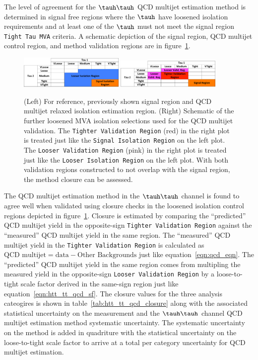 The level of agreement for the $\tauh\tauh$ QCD multijet estimation method
is determined in signal free regions where the $\tauh$ have loosened isolation requirements and at least
one of the $\tauh$ must not meet the signal region \texttt{Tight Tau MVA} criteria. A schematic depiction
of the signal region, QCD multijet control region, and method validation regions are in 
figure~\ref{fig:htt_tautau_qcd_schematic2}.

\begin{figure}[htbp]
\centering
     \includegraphics[width=0.45\textwidth]{higgs_to_taus/plots/tautau_QCD_signal_region.pdf}
     \includegraphics[width=0.45\textwidth]{higgs_to_taus/plots/tautau_QCD_closureTestRegions.pdf}\\
     \caption{
(Left) For reference, previously shown signal region and QCD multijet relaxed isolation estimation region.
(Right) Schematic of the further loosened MVA isolation selections used for the QCD multijet validation.
The \texttt{Tighter Validation Region} (red) in the right plot is treated just like the \texttt{Signal Isolation Region}
on the left plot. The \texttt{Looser Validation Region} (pink) in the right plot is treated just like the 
\texttt{Looser Isolation Region} on the left plot. With both validation regions constructed to not overlap with the
signal region, the method closure can be assessed.
     }
     \label{fig:htt_tautau_qcd_schematic2}
\end{figure}

The QCD multijet estimation method in the $\tauh\tauh$ channel is found to agree well when validated using closure
checks in the loosened isolation control regions depicted in figure~\ref{fig:htt_tautau_qcd_schematic2}.
Closure is estimated by comparing the ``predicted'' QCD multijet yield in the opposite-sign
\texttt{Tighter Validation Region} against the ``measured'' QCD multijet yield in the same region. 
The ``measured'' QCD multijet yield in the \texttt{Tighter Validation Region} is calculated as 
$\text{QCD multijet} = \text{data} - \text{Other Backgrounds}$ just like equation~\ref{eqn:qcd_eqn}.
The ``predicted'' QCD multijet yield in the same region comes from multipling the measured yield in the
opposite-sign \texttt{Looser Validation Region} by a loose-to-tight scale factor derived in the same-sign
region just like equation~\ref{eqn:htt_tt_qcd_sf}. The closure values for the three analysis cateogires
is shown in table~\ref{tab:htt_tt_qcd_closure} along with the associated statistical uncertainty on the
measurement and the $\tauh\tauh$ channel QCD multijet estimation method systematic uncertainty. The 
systematic uncertainty on the method is added in quadriture with the statistical uncertainty on the
loose-to-tight scale factor to arrive at a total per category uncertainty for QCD multijet estimation.

